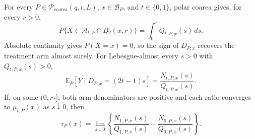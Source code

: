 For every \(P\in\mathcal P_{\mathrm{coarea}}(q,\iota,L)\), \(x\in\mathcal B_P\), and \(t\in\{0,1\}\), polar coarea gives, for every \(r>0\),
\[
 P\{X\in\mathcal A_{t,P}\cap B_2(x,r)\}=\int_0^rQ_{t,P,x}(s)\,ds.
\]
Absolute continuity gives \(P(X=x)=0\), so the sign of \(D_{P,x}\) recovers the treatment arm almost surely.  For Lebesgue-almost every \(s>0\) with \(Q_{t,P,x}(s)>0\),
\[
 \mathbb E_P[Y\mid D_{P,x}=(2t-1)s]=\frac{N_{t,P,x}(s)}{Q_{t,P,x}(s)}.
\]
If, on some \((0,r_*]\), both arm denominators are positive and each ratio converges to \(\mu_{t,P}(x)\) as \(s\downarrow0\), then
\[
 \tau_P(x)=\lim_{s\downarrow0}\left\{\frac{N_{1,P,x}(s)}{Q_{1,P,x}(s)}-\frac{N_{0,P,x}(s)}{Q_{0,P,x}(s)}\right\}.
\]